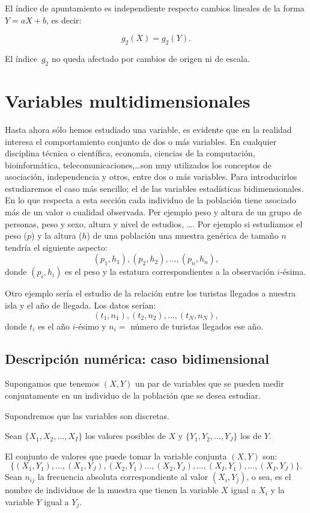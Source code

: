 \documentclass[12pt]{report}
\begin{document}
El  índice de apuntamiento es independiente respecto cambios lineales  de la forma
$Y=aX+b$, es decir:

 $$g_2(X)=g_2(Y).$$


El índice~$g_2$ no queda afectado por cambios de origen ni de escala.

\section{Variables multidimensionales}
Hasta ahora sólo hemos estudiado una variable, es evidente que en la realidad interesa el
comportamiento conjunto de dos o más variables. En cualquier disciplina técnica o
científica, economía, ciencias de la computación, bioinformática,
telecomunicaciones,\ldots son muy utilizados los conceptos de asociación, independencia y
otros, entre dos o más variables. Para introducirlos estudiaremos el caso más sencillo;
el de las variables estadísticas bidimensionales. En lo que respecta a esta sección cada
individuo de la población tiene asociado más de un valor o cualidad observada.  Per
ejemplo peso y altura de un grupo de personas, peso y sexo, altura y nivel de estudios,
\ldots. Por ejemplo  si estudiamos el peso ($p$) y la altura ($h$) de una población una
muestra genérica de tama\~{n}o $n$ tendría el siguiente aspecto:
$$
 (p_1,h_1),(p_2,h_2),\ldots,(p_n,h_n),
$$
donde  $(p_i, h_i)$ es el peso y la estatura correspondientes a la observación $i$-ésima.

Otro ejemplo sería el estudio de la relación entre los turistas llegados a nuestra isla y
el a\~{n}o de llegada. Los datos serían:
$$
 (t_1,n_1),(t_2,n_2),\ldots,(t_N,n_N),
$$
donde $t_i$ es el a\~{n}o $i$-ésimo y  $n_i=$ número de turistas llegados ese a\~{n}o.

\subsection{Descripción numérica: caso bidimensional}


Supongamos que tenemos $(X,Y)$  un par de variables que se pueden medir conjuntamente en
un individuo de la población que se desea estudiar.

Supondremos que las variables son discretas.


Sean $\{X_1,X_2,\ldots, X_I\}$ los valores posibles de  $X$ y   $\{Y_1,Y_2,\ldots, Y_J\}$
los de $Y$.

El conjunto de valores que puede tomar la variable conjunta $(X,Y)$ son:
$$
\{(X_1,Y_1),\ldots,(X_1,Y_J),(X_2,Y_1)\ldots,(X_2,Y_J),\ldots,(X_I,Y_1),\ldots
,(X_I,Y_J)\}.
$$
Sean $n_{ij}$ la frecuencia absoluta correspondiente al valor  $(X_i,Y_j)$, o sea, es el
nombre de individuos de la muestra que tienen la variable $X$ igual a $X_i$ y la variable
$Y$ igual a $Y_j$.
\end{document}
